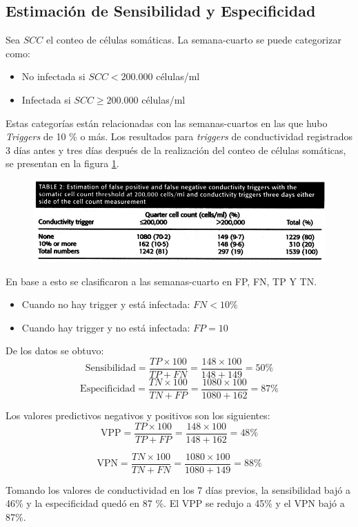 \documentclass[a4paper, 11pt]{article}
\begin{document}
\subsection{Estimación de Sensibilidad y Especificidad}
Sea $SCC$ el conteo de células somáticas. La semana-cuarto se puede categorizar como:
\begin{itemize}
	\item No infectada si $SCC < 200.000$ células/ml
	\item Infectada si $SCC \geq 200.000$ células/ml 
\end{itemize}
Estas categorías están relacionadas con las semanas-cuartos en las que hubo \emph{Triggers} de 10 \% o más. Los resultados para \emph{triggers} de conductividad registrados 3 días antes y tres días después de la realización del conteo de células somáticas, se presentan en la figura \ref{fig:table2}.
\begin{figure}[H]
	\centering
	\includegraphics[width=0.9\linewidth]{img/table2}
	\caption{ \label{fig:table2}}
\end{figure}
En base a esto se clasificaron a las semanas-cuarto en FP, FN, TP Y TN.
\begin{itemize}
	\item Cuando no hay trigger y está infectada: $FN<10\%$ 
	\item Cuando hay trigger y no está infectada: $FP=10$
\end{itemize}
De los datos se obtuvo:
$$\text{Sensibilidad}=\frac{TP\times 100}{TP+FN}=\frac{148\times 100}{148+149}=50\% $$
$$\text{Especificidad}=\frac{TN\times 100}{TN+FP}=\frac{1080\times 100}{1080+162}=87\% $$

Los valores predictivos negativos y positivos son los siguientes:
$$\text{VPP}=\frac{TP\times 100}{TP+FP}=\frac{148\times 100}{148+162}=48\% $$

$$\text{VPN}=\frac{TN\times 100}{TN+FN}=\frac{1080\times 100}{1080+149}=88\% $$

Tomando los valores de conductividad en los 7 días previos, la sensibilidad bajó a 46\% y la especificidad quedó en 87 \%. El VPP se redujo a 45\% y el VPN bajó a 87\%.
\end{document}
